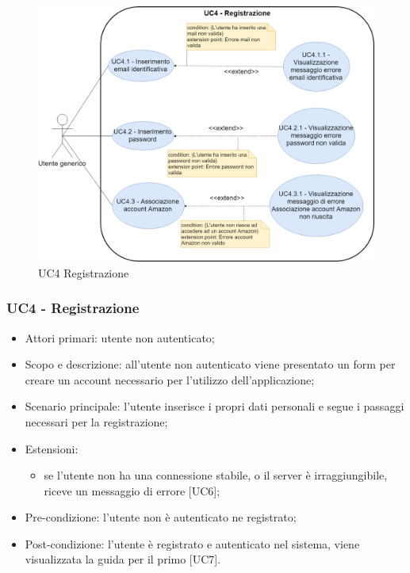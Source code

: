 \begin{figure}[H]
	\centering
	\includegraphics[width=15cm,keepaspectratio]{../includes/pics/registrazione_postRR.png}
	\caption{\label{fig:mission}UC4 Registrazione}
\end{figure}

\subsubsection{UC4 - Registrazione}
\begin{itemize}
	\item  Attori primari: utente non autenticato;
	\item Scopo e descrizione: all'utente non autenticato viene presentato un form per creare un account necessario per l'utilizzo dell'applicazione;
	\item  Scenario principale: l'utente inserisce i propri dati personali e segue i passaggi necessari per la registrazione;
	\item  Estensioni:
		   \begin{itemize}
		   	    \item se l'utente non ha una connessione stabile, o il server è irraggiungibile, riceve un messaggio di errore [UC6];
		   \end{itemize}		    
	\item  Pre-condizione: l'utente non è autenticato ne registrato;
	\item  Post-condizione: l'utente è registrato e autenticato nel sistema, viene visualizzata la guida per il primo  [UC7].
\end{itemize}
